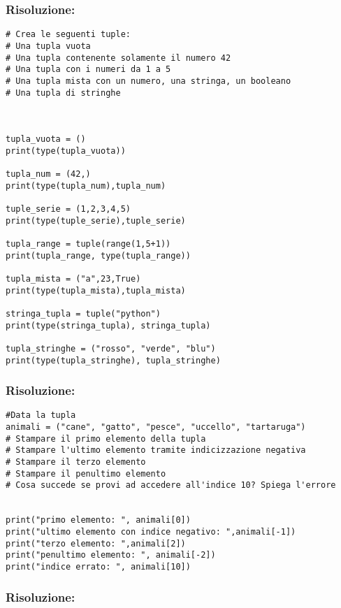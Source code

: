 \subsubsection{Risoluzione: }

\begin{lstlisting}
# Crea le seguenti tuple:
# Una tupla vuota
# Una tupla contenente solamente il numero 42
# Una tupla con i numeri da 1 a 5
# Una tupla mista con un numero, una stringa, un booleano
# Una tupla di stringhe



tupla_vuota = ()
print(type(tupla_vuota))

tupla_num = (42,)
print(type(tupla_num),tupla_num)

tuple_serie = (1,2,3,4,5)
print(type(tuple_serie),tuple_serie)

tupla_range = tuple(range(1,5+1))
print(tupla_range, type(tupla_range))

tupla_mista = ("a",23,True)
print(type(tupla_mista),tupla_mista)

stringa_tupla = tuple("python")
print(type(stringa_tupla), stringa_tupla)

tupla_stringhe = ("rosso", "verde", "blu")
print(type(tupla_stringhe), tupla_stringhe)
\end{lstlisting}


\subsubsection{Risoluzione: }

\begin{lstlisting}
#Data la tupla
animali = ("cane", "gatto", "pesce", "uccello", "tartaruga")
# Stampare il primo elemento della tupla
# Stampare l'ultimo elemento tramite indicizzazione negativa
# Stampare il terzo elemento
# Stampare il penultimo elemento
# Cosa succede se provi ad accedere all'indice 10? Spiega l'errore


print("primo elemento: ", animali[0])
print("ultimo elemento con indice negativo: ",animali[-1])
print("terzo elemento: ",animali[2])
print("penultimo elemento: ", animali[-2])
print("indice errato: ", animali[10])
\end{lstlisting}


\subsubsection{Risoluzione: }

